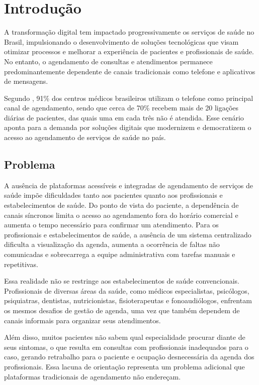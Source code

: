 \chapter{Introdução}
\label{chap:introduction}

A transformação digital tem impactado progressivamente os serviços
de saúde no Brasil, impulsionando o desenvolvimento de soluções
tecnológicas que visam otimizar processos e melhorar a experiência
de pacientes e profissionais de saúde. No entanto, o agendamento
de consultas e atendimentos permanece predominantemente dependente
de canais tradicionais como telefone e aplicativos de mensagens.

Segundo , 91\% dos centros médicos
brasileiros utilizam o telefone como principal canal de
agendamento, sendo que cerca de 70\% recebem mais de 20 ligações
diárias de pacientes, das quais uma em cada três não é atendida.
Esse cenário aponta para a demanda por soluções digitais que
modernizem e democratizem o acesso ao agendamento de serviços
de saúde no país.

\section{Problema}
\label{sec:problem}

A ausência de plataformas acessíveis e integradas de agendamento
de serviços de saúde impõe dificuldades tanto aos pacientes
quanto aos profissionais e estabelecimentos de saúde. Do ponto de vista do
paciente, a dependência de canais síncronos limita o acesso
ao agendamento fora do horário comercial e aumenta o tempo
necessário para confirmar um atendimento. Para os profissionais
e estabelecimentos de saúde, a ausência de um sistema centralizado dificulta a
visualização da agenda, aumenta a ocorrência de faltas não
comunicadas e sobrecarrega a equipe administrativa com tarefas
manuais e repetitivas.

Essa realidade não se restringe aos estabelecimentos de saúde
convencionais. Profissionais de diversas áreas da saúde, como
médicos especialistas, psicólogos, psiquiatras, dentistas,
nutricionistas, fisioterapeutas e fonoaudiólogos, enfrentam
os mesmos desafios de gestão de agenda, uma vez que também
dependem de canais informais para organizar seus atendimentos.

Além disso, muitos pacientes não sabem qual especialidade
procurar diante de seus sintomas, o que resulta em consultas
com profissionais inadequados para o caso, gerando retrabalho
para o paciente e ocupação desnecessária da agenda dos
profissionais. Essa lacuna de orientação representa um problema
adicional que plataformas tradicionais de agendamento não
endereçam.


